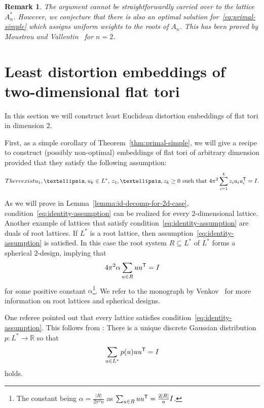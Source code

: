 \documentclass{amsart}
\newtheorem{remark}[defin]{Remark}
\newcommand{\R}{\mathbb{R}}
\begin{document}
\begin{remark}
  The argument cannot be straightforwardly carried over to the lattice
  $ A_n^* $. However, we conjecture that there is also an optimal
  solution for~\eqref{eq:primal-simple} which assigns uniform weights
  to the roots of $ A_n $. This has been proved by Moustrou and
  Vallentin~\cite{Moustrou2023a} for $n = 2$.
\end{remark}

%
%
%

\section{Least distortion embeddings of two-dimensional flat tori}
\label{sec:2d-embeddings}

In this section we will construct least Euclidean distortion
embeddings of flat tori in dimension $2$.

First, as a simple corollary of Theorem~\ref{thm:primal-simple}, we
will give a recipe to construct (possibly non-optimal) embeddings of
flat tori of arbitrary dimension provided that they satisfy the
following assumption:
\begin{align}\label{eq:identity-assumption}
	\textup{There exist } u_1,\ldots, u_k \in L^*,  \, z_1,\ldots,z_k \ge 0 \text{ such that }
	4\pi^2 \sum_{i = 1}^k z_i u_i u_i^{\sf T} = I.
\end{align}

As we will prove in Lemma~\ref{lemma:id-decomp-for-2d-case},
condition~\eqref{eq:identity-assumption} can be realized for every
$2$-dimensional lattice. Another example of lattices that satisfy
condition~\eqref{eq:identity-assumption} are duals of root
lattices. If $L^*$ is a root lattice, then
assumption~\eqref{eq:identity-assumption} is satisfied. In this case
the root system $R \subseteq L^*$ of $L^*$ forms a spherical
$2$-design, implying that
\[
4\pi^2 \alpha \sum_{u \in R} uu^{\sf T} =  I
\]
for some positive constant $\alpha$\footnote{The constant being $\alpha = \frac{|R|}{2\pi^2 n}$ as $\sum_{u \in R} uu^{\sf T} = \frac{2|R|}{n} I$.}. We refer to the monograph by
Venkov~\cite{Venkov2001a} for more information on root lattices and
spherical designs.

One referee pointed out that every lattice satisfies condition~\eqref{eq:identity-assumption}. This follows from \cite[Theorem 2.5]{Agostini2019a}: There is a unique discrete Gaussian distribution $p : L^* \to \R$ so that
\[
\sum_{u \in L^*} p(u) uu^{\sf T} =  I
\]
holds. 
\end{document}
